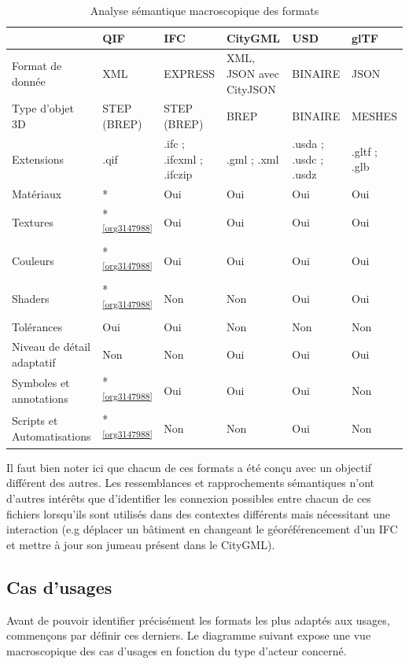 \documentclass[a4paper,12pt]{article}
\begin{document}
\begin{table}[htbp]
\caption{Analyse sémantique macroscopique des formats}
\centering
\begin{tabular}{llllll}
 & QIF & IFC & CityGML & USD & glTF\\
\hline
Format de donnée & XML & EXPRESS & XML, JSON avec CityJSON & BINAIRE & JSON\\
Type d'objet 3D & STEP (BREP) & STEP (BREP) & BREP & BINAIRE & MESHES\\
Extensions & .qif & .ifc ; .ifcxml ; .ifczip & .gml ; .xml & .usda ; .usdc ; .usdz & .gltf ; .glb\\
Matériaux & *\footnotemark & Oui & Oui & Oui & Oui\\
Textures & *\textsuperscript{\ref{org3147988}} & Oui & Oui & Oui & Oui\\
Couleurs & *\textsuperscript{\ref{org3147988}} & Oui & Oui & Oui & Oui\\
Shaders & *\textsuperscript{\ref{org3147988}} & Non & Non & Oui & Oui\\
Tolérances & Oui & Oui & Non & Non & Non\\
Niveau de détail adaptatif & Non & Non & Oui & Oui & Oui\\
Symboles et annotations & *\textsuperscript{\ref{org3147988}} & Oui & Oui & Oui & Non\\
Scripts et Automatisations & *\textsuperscript{\ref{org3147988}} & Non & Non & Oui & Non\\
\end{tabular}
\end{table}

Il faut bien noter ici que chacun de ces formats a été conçu avec un objectif différent des autres. Les ressemblances et rapprochements sémantiques n'ont d'autres intérêts que d'identifier les connexion possibles entre chacun de ces fichiers lorsqu'ils sont utilisés dans des contextes différents mais nécessitant une interaction (e.g déplacer un bâtiment en changeant le géoréférencement d'un IFC et mettre à jour son jumeau présent dans le CityGML).
\subsection*{Cas d'usages}
\label{sec:orgbde91cd}
Avant de pouvoir identifier précisément les formats les plus adaptés aux usages, commençons par définir ces derniers. Le diagramme suivant expose une vue macroscopique des cas d'usages en fonction du type d'acteur concerné.
\end{document}
